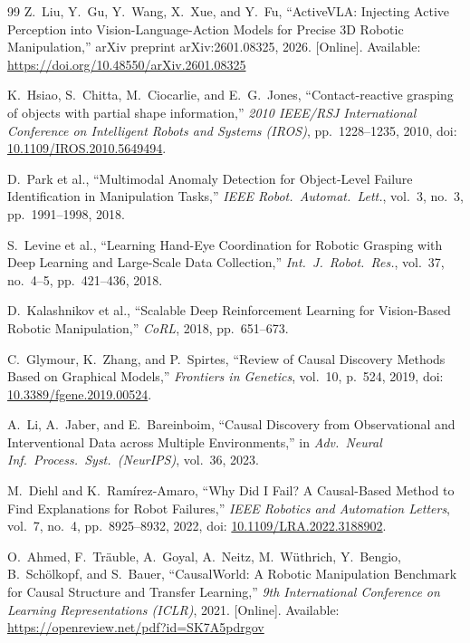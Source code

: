 \documentclass[11pt,a4paper]{report}
\begin{document}
\begin{thebibliography}{99}
Z.~Liu, Y.~Gu, Y.~Wang, X.~Xue, and Y.~Fu,
``ActiveVLA: Injecting Active Perception into Vision-Language-Action Models for Precise 3D Robotic Manipulation,''
arXiv preprint arXiv:2601.08325, 2026.
[Online]. Available: \url{https://doi.org/10.48550/arXiv.2601.08325}

K.~Hsiao, S.~Chitta, M.~Ciocarlie, and E.~G.~Jones,
``Contact-reactive grasping of objects with partial shape information,''
\emph{2010 IEEE/RSJ International Conference on Intelligent Robots and Systems (IROS)}, pp.~1228--1235, 2010,
doi: \href{https://doi.org/10.1109/IROS.2010.5649494}{10.1109/IROS.2010.5649494}.

D.~Park et al., ``Multimodal Anomaly Detection for Object-Level
Failure Identification in Manipulation Tasks,''
\emph{IEEE Robot.\ Automat.\ Lett.}, vol.~3, no.~3,
pp.~1991--1998, 2018.

S.~Levine et al., ``Learning Hand-Eye Coordination for Robotic
Grasping with Deep Learning and Large-Scale Data Collection,''
\emph{Int.\ J.\ Robot.\ Res.}, vol.~37, no.~4--5,
pp.~421--436, 2018.

D.~Kalashnikov et al., ``Scalable Deep Reinforcement Learning for
Vision-Based Robotic Manipulation,'' \emph{CoRL}, 2018,
pp.~651--673.

C.~Glymour, K.~Zhang, and P.~Spirtes,
``Review of Causal Discovery Methods Based on Graphical Models,''
\emph{Frontiers in Genetics}, vol.~10, p.~524, 2019,
doi: \href{https://doi.org/10.3389/fgene.2019.00524}{10.3389/fgene.2019.00524}.

A.~Li, A.~Jaber, and E.~Bareinboim,
``Causal Discovery from Observational and Interventional Data across Multiple Environments,''
in \emph{Adv.\ Neural Inf.\ Process.\ Syst.\ (NeurIPS)}, vol.~36, 2023.

M.~Diehl and K.~Ram\'irez-Amaro,
``Why Did I Fail? A Causal-Based Method to Find Explanations for Robot Failures,''
\emph{IEEE Robotics and Automation Letters}, vol.~7, no.~4, pp.~8925--8932, 2022,
doi: \href{https://doi.org/10.1109/LRA.2022.3188902}{10.1109/LRA.2022.3188902}.

O.~Ahmed, F.~Tr\"auble, A.~Goyal, A.~Neitz, M.~W\"uthrich, Y.~Bengio, B.~Sch\"olkopf, and S.~Bauer,
``CausalWorld: A Robotic Manipulation Benchmark for Causal Structure and Transfer Learning,''
\emph{9th International Conference on Learning Representations (ICLR)}, 2021.
[Online]. Available: \url{https://openreview.net/pdf?id=SK7A5pdrgov}


\end{thebibliography}
\end{document}
